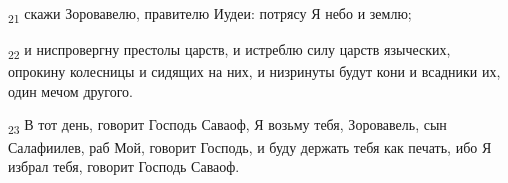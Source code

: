 \begin{tcolorbox}
\textsubscript{21} скажи Зоровавелю, правителю Иудеи: потрясу Я небо и землю;
\end{tcolorbox}
\begin{tcolorbox}
\textsubscript{22} и ниспровергну престолы царств, и истреблю силу царств языческих, опрокину колесницы и сидящих на них, и низринуты будут кони и всадники их, один мечом другого.
\end{tcolorbox}
\begin{tcolorbox}
\textsubscript{23} В тот день, говорит Господь Саваоф, Я возьму тебя, Зоровавель, сын Салафиилев, раб Мой, говорит Господь, и буду держать тебя как печать, ибо Я избрал тебя, говорит Господь Саваоф.
\end{tcolorbox}
